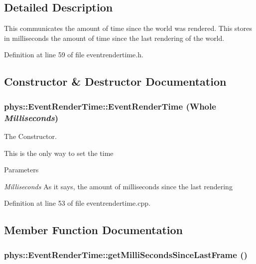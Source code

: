\subsection{Detailed Description}
This communicates the amount of time since the world was rendered. This stores in milliseconds the amount of time since the last rendering of the world. 

Definition at line 59 of file eventrendertime.h.



\subsection{Constructor \& Destructor Documentation}
\hypertarget{classphys_1_1EventRenderTime_af2384f7b09bbea42dcd2539a9e1747fd}{
\subsubsection[{EventRenderTime}]{\setlength{\rightskip}{0pt plus 5cm}phys::EventRenderTime::EventRenderTime ({\bf Whole} {\em Milliseconds})}}
\label{d3/d8b/classphys_1_1EventRenderTime_af2384f7b09bbea42dcd2539a9e1747fd}


The Constructor. 

This is the only way to set the time 
\begin{DoxyParams}{Parameters}
\item[{\em Milliseconds}]As it says, the amount of milliseconds since the last rendering \end{DoxyParams}


Definition at line 53 of file eventrendertime.cpp.



\subsection{Member Function Documentation}
\hypertarget{classphys_1_1EventRenderTime_ac9f20f13bf1f6e542151be2ce8ea2fa4}{
\subsubsection[{getMilliSecondsSinceLastFrame}]{ phys::EventRenderTime::getMilliSecondsSinceLastFrame ()}}
\label{d3/d8b/classphys_1_1EventRenderTime_ac9f20f13bf1f6e542151be2ce8ea2fa4}


